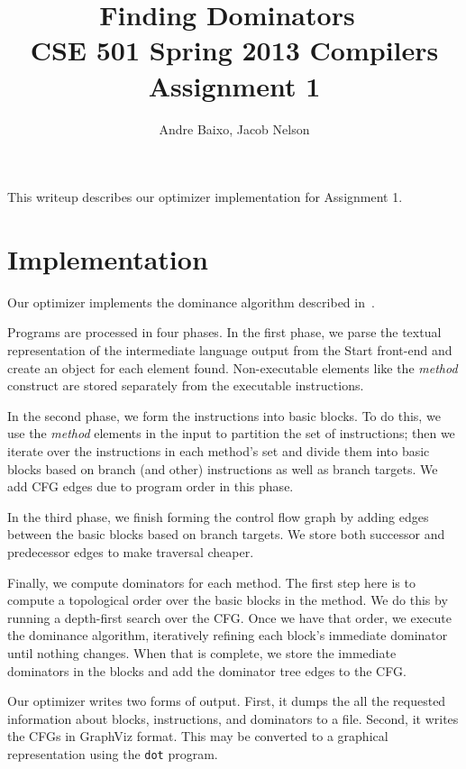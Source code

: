 \documentclass[10pt,twocolumn]{article}
\begin{document}
\title{Finding Dominators\ \\
  \small CSE 501 Spring 2013 Compilers Assignment 1}
\author{Andre Baixo, Jacob Nelson}
\maketitle

This writeup describes our optimizer implementation for Assignment 1.

\section{Implementation}

Our optimizer implements the dominance algorithm described in~\cite{Cooper_asimple}. 

Programs are processed in four phases. In the first phase, we parse
the textual representation of the intermediate language output from
the Start front-end and create an object for each element
found. Non-executable elements like the {\it method} construct are
stored separately from the executable instructions.

In the second phase, we form the instructions into basic blocks. To do
this, we use the {\it method} elements in the input to partition the
set of instructions; then we iterate over the instructions in each
method's set and divide them into basic blocks based on branch (and
other) instructions as well as branch targets. We add CFG edges due to
program order in this phase.

In the third phase, we finish forming the control flow graph by adding
edges between the basic blocks based on branch targets. We store both
successor and predecessor edges to make traversal cheaper. 

Finally, we compute dominators for each method. The first step here is
to compute a topological order over the basic blocks in the method. We
do this by running a depth-first search over the CFG. Once we have
that order, we execute the dominance algorithm, iteratively refining
each block's immediate dominator until nothing changes. When that is
complete, we store the immediate dominators in the blocks and add the
dominator tree edges to the CFG.

Our optimizer writes two forms of output. First, it dumps the all the
requested information about blocks, instructions, and dominators to a
file. Second, it writes the CFGs in GraphViz format. This may be
converted to a graphical representation using the \texttt{dot} program.
\end{document}
